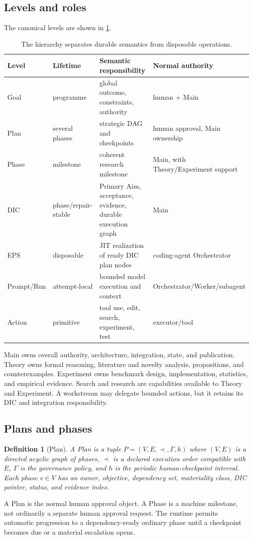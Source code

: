 \documentclass[11pt,a4paper]{article}
\newtheorem{definition}{Definition}[section]
\begin{document}
\subsection{Levels and roles}
The canonical levels are shown in \cref{tab:levels}.
\begin{table}[ht]
\centering
\small
\begin{tabularx}{\textwidth}{@{}l l X X@{}}
\toprule
Level & Lifetime & Semantic responsibility & Normal authority\\
\midrule
Goal & programme & global outcome, constraints, authority & human + Main\\
Plan & several phases & strategic DAG and checkpoints & human approval, Main ownership\\
Phase & milestone & coherent research milestone & Main, with Theory/Experiment support\\
DIC & phase/repair-stable & Primary Aim, acceptance, evidence, durable execution graph & Main\\
EPS & disposable & JIT realization of ready DIC plan nodes & coding-agent Orchestrator\\
Prompt/Run & attempt-local & bounded model execution and context & Orchestrator/Worker/subagent\\
Action & primitive & tool use, edit, search, experiment, test & executor/tool\\
\bottomrule
\end{tabularx}
\caption{The hierarchy separates durable semantics from disposable operations.}
\label{tab:levels}
\end{table}

Main owns overall authority, architecture, integration, state, and publication. Theory owns formal reasoning, literature and novelty analysis, propositions, and counterexamples. Experiment owns benchmark design, implementation, statistics, and empirical evidence. Search and research are capabilities available to Theory and Experiment. A workstream may delegate bounded actions, but it retains its DIC and integration responsibility.

\subsection{Plans and phases}
\begin{definition}[Plan]
A Plan is a tuple $P=(V,E,\prec,\Gamma,h)$ where $(V,E)$ is a directed acyclic graph of phases, $\prec$ is a declared execution order compatible with $E$, $\Gamma$ is the governance policy, and $h$ is the periodic human-checkpoint interval. Each phase $v\in V$ has an owner, objective, dependency set, materiality class, DIC pointer, status, and evidence index.
\end{definition}
A Plan is the normal human approval object. A Phase is a machine milestone, not ordinarily a separate human approval request. The runtime permits automatic progression to a dependency-ready ordinary phase until a checkpoint becomes due or a material escalation opens.
\end{document}
